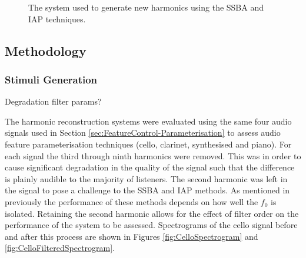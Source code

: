		\begin{figure}[h!]
			\centering
			\caption{The system used to generate new harmonics using the SSBA and IAP techniques.}
			\label{fig:FilterAndShift}
		\end{figure}

	\subsection{Methodology}
	\label{sec:PerceptualExperiments-Reconstruction-Methodology}
		\subsubsection*{Stimuli Generation}
			\note
			{
				Degradation filter params?
			}

			The harmonic reconstruction systems were evaluated using the same four audio signals used in
			Section \ref{sec:FeatureControl-Parameterisation} to assess audio feature parameterisation
			techniques (cello, clarinet, synthesised and piano). For each signal the third through ninth
			harmonics were removed. This was in order to cause significant degradation in the quality of the
			signal such that the difference is plainly audible to the majority of listeners. The second
			harmonic was left in the signal to pose a challenge to the SSBA and IAP methods. As mentioned in
			previously the performance of these methods depends on how well the $f_{0}$ is isolated.  Retaining
			the second harmonic allows for the effect of filter order on the performance of the system to be
			assessed. Spectrograms of the cello signal before and after this process are shown in Figures
			\ref{fig:CelloSpectrogram} and \ref{fig:CelloFilteredSpectrogram}. 

